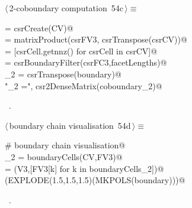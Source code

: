\documentclass[11pt,oneside]{article}    %
\begin{document}
\begin{flushleft} \small \label{scrap95}
\protect{}$\langle\,$2-coboundary computation\nobreak\ {\footnotesize 54c}$\,\rangle\equiv$
\vspace{-1ex}
\begin{list}{}{} \item
\mbox{}\verb@csrCV = csrCreate(CV)@\\
\mbox{} = matrixProduct(csrFV3, csrTranspose(csrCV))@\\
\mbox{}\verb@facetLengths = [csrCell.getnnz() for csrCell in csrCV]@\\
\mbox{}\verb@boundary = csrBoundaryFilter(csrFC3,facetLengths)@\\
\mbox{}\verb@coboundary_2 = csrTranspose(boundary)@\\
\mbox{}\verb@print "\ncoboundary_2 =\n", csr2DenseMatrix(coboundary_2)@\\
\mbox{}\verb@@{\NWsep}
\end{list}
\vspace{-1ex}
\footnotesize\addtolength{\baselineskip}{-1ex}
\begin{list}{}{\setlength{\itemsep}{-\parsep}\setlength{\itemindent}{-\leftmargin}}
\item \NWtxtMacroRefIn\ .
\end{list}
\end{flushleft}

\begin{flushleft} \small \label{scrap96}
\protect{}$\langle\,$boundary chain visualisation\nobreak\ {\footnotesize 54d}$\,\rangle\equiv$
\vspace{-1ex}
\begin{list}{}{} \item
\mbox{}\verb@# boundary chain visualisation@\\
\mbox{}\verb@boundaryCells_2 = boundaryCells(CV,FV3)@\\
\mbox{}\verb@boundary = (V3,[FV3[k] for k in boundaryCells_2])@\\
\mbox{}\verb@VIEW(EXPLODE(1.5,1.5,1.5)(MKPOLS(boundary)))@\\
\mbox{}\verb@@{\NWsep}
\end{list}
\vspace{-1ex}
\footnotesize\addtolength{\baselineskip}{-1ex}
\begin{list}{}{\setlength{\itemsep}{-\parsep}\setlength{\itemindent}{-\leftmargin}}
\item \NWtxtMacroRefIn\ .
\end{list}
\end{flushleft}
\end{document}

